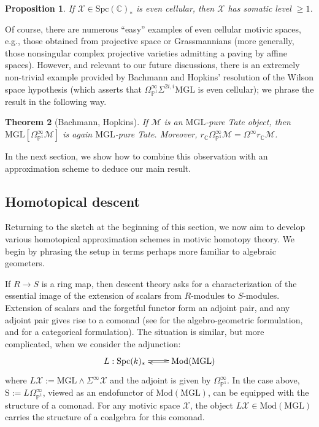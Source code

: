 \documentclass[11pt,leqno]{article}
\newcommand{\cplx}{{\mathbb C}}
\newcommand{\pone}{{\mathbb P}^1}
\renewcommand{\1}{{\rm 1\hspace*{-0.4ex}%
\rule{0.1ex}{1.52ex}\hspace*{0.2ex}}}
\newcommand{\Spc}{\mathrm{Spc}}
\newcommand{\<}[1]{{\langle}#1 {\rangle}}
\theoremstyle{plain}
\newtheorem{theorem}{Theorem}[subsection]
\newtheorem{proposition}[theorem]{Proposition}
\theoremstyle{definition}
\theoremstyle{remark}
\numberwithin{equation}{subsection}
\begin{document}
\begin{proposition}
	If $\mathscr{X} \in \Spc(\cplx)_*$ is even cellular, then $\mathscr{X}$ has somatic level $\geq 1$.
\end{proposition}

Of course, there are numerous ``easy'' examples of even cellular motivic spaces, e.g., those obtained from projective space or Grassmannians (more generally, those nonsingular complex projective varieties admitting a paving by affine spaces).  However, and relevant to our future discussions, there is an extremely non-trivial example provided by Bachmann and Hopkins' resolution of the Wilson space hypothesis (which asserts that $\Omega^{\infty}_{\pone}\Sigma^{2i,i}\mathrm{MGL}$ is even cellular); we phrase the result in the following way. 

\begin{theorem}[Bachmann, Hopkins]
	\label{thm:wilsonspacehypoth}
	If $\mathscr{M}$ is an $\mathrm{MGL}$-pure Tate object, then $\mathrm{MGL}[\Omega^{\infty}_{\pone}\mathscr{M}]$ is again $\mathrm{MGL}$-pure Tate.  Moreover, $r_{\cplx}\Omega_{\pone}^{\infty} \mathscr{M} = \Omega^{\infty}r_{\cplx}\mathscr{M}$.
\end{theorem}

In the next section, we show how to combine this observation with an approximation scheme to deduce our main result.

\subsection{Homotopical descent}
\label{ss:homotopicaldescent}
Returning to the sketch at the beginning of this section, we now aim to develop various homotopical approximation schemes in motivic homotopy theory.  We begin by phrasing the setup in terms perhaps more familiar to algebraic geometers.  

If $R \to S$ is a ring map, then descent theory asks for a characterization of the essential image of the extension of scalars from $R$-modules to $S$-modules.  Extension of scalars and the forgetful functor form an adjoint pair, and any adjoint pair gives rise to a comonad (see \cite{Grothendieck1960DescenteI} for the algebro-geometric formulation, and \cite{Beck1967Triples} for a categorical formulation).   The situation is similar, but more complicated, when we consider the adjunction:
\[
\xymatrix{
L: \Spc(k)_* \ar@<.3ex>[r] & \ar@<.3ex>[l] \mathrm{Mod}(\mathrm{MGL})
}
\]
where $L\mathscr{X} := \mathrm{MGL} \wedge \Sigma^{\infty} \mathscr{X}$ and the adjoint is given by $\Omega^{\infty}_{\pone}$.  In the case above, $\mathrm{S} := L\Omega^{\infty}_{\pone}$, viewed as an endofunctor of $\mathrm{Mod}(\mathrm{MGL})$, can be equipped with the structure of a comonad.  For any motivic space $\mathscr{X}$, the object $L\mathscr{X} \in \mathrm{Mod}(\mathrm{MGL})$ carries the structure of a coalgebra for this comonad.  
\end{document}
